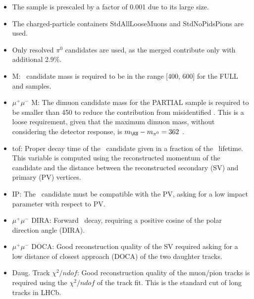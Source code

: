 \begin{itemize}
 \item The \Kspipi sample is prescaled by a factor of 0.001 due to its large size.
 \item The charged-particle containers StdAllLooseMuons and StdNoPidsPions are used.
 \item Only resolved $\pi^{0}$ candidates are used, as the merged contribute only with additional 2.9\%.
 \item \KS{}  M: \KS\ candidate mass is required to be in the range [400, 600] \mevcc{} for the FULL and \Kspipi samples.
 \item $\mu^{+}\mu^{-}$  M: The dimuon candidate mass for the PARTIAL sample is required to be smaller than 450 \mevcc to reduce the contribution from misidentified \Kspipi. This is a loose requirement,
       given that the maximum dimuon mass, without considering the detector response, is $m_{\KS}-m_{\pi^{0}}=362$ \mevcc.
 \item \KS{} tof: Proper decay time of the \KS\ candidate given in a fraction of the \KS\ lifetime. This variable is computed using the reconstructed momentum of the \KS candidate and the distance between 
      the reconstructed secondary (SV) and primary (PV) vertices.
 \item \KS{} IP:  The \KS\ candidate must be compatible with the PV, asking for a low impact parameter with respect to PV.
 \item $\mu^{+}\mu^{-}$ DIRA: Forward \KS\ decay, requiring a positive cosine of the polar direction angle (DIRA).
 \item $\mu^{+}\mu^{-}$ DOCA: Good reconstruction quality of the SV required asking for a low distance of closest approach (DOCA) of the two daughter tracks.
 \item Daug. Track $\chi^{2}/ndof$:  Good reconstruction quality of the muon/pion tracks is required using the $\chi^{2}/ndof$ of the track fit. This is the standard cut of long tracks in LHCb.


\end{itemize}
